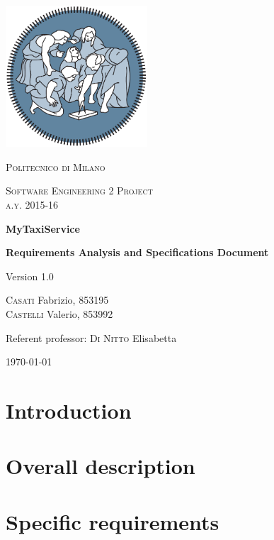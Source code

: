



\begin{titlepage}
	\centering
	\includegraphics[width=150pt]{images/polimi_logo}\par\vspace{1cm}
	{\scshape\LARGE
		Politecnico di Milano\par}
	\vspace{1cm}
	{\scshape\Large
		Software Engineering 2 Project\\
		a.y. 2015-16\par}
	\vspace{1.5cm}
	{\huge\bfseries
		MyTaxiService\\\par}
	{\Large\bfseries
		Requirements Analysis and Specifications Document\par}
	Version 1.0\par
	\vspace{2cm}
	{\Large
		{\scshape Casati} Fabrizio, 853195\\
		{\scshape Castelli} Valerio, 853992\par}
	\vfill
	Referent professor: {\scshape Di Nitto} Elisabetta\par
	\vfill
	{\large\today\par}
\end{titlepage}

\tableofcontents

\chapter{Introduction}


\chapter{Overall description}


\chapter{Specific requirements}


